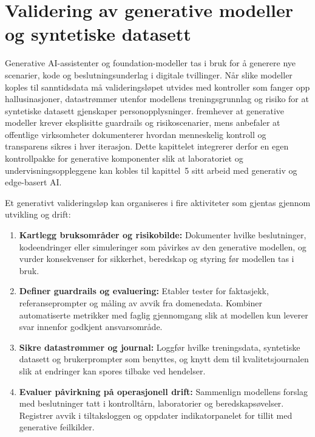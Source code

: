 \section{Validering av generative modeller og syntetiske datasett}
Generative AI-assistenter og foundation-modeller tas i bruk for å generere nye scenarier, kode og beslutningsunderlag i digitale tvillinger.\citep{siemens2023copilot,rcn2024digitalisering} Når slike modeller koples til sanntidsdata må valideringsløpet utvides med kontroller som fanger opp hallusinasjoner, datastrømmer utenfor modellens treningsgrunnlag og risiko for at syntetiske datasett gjenskaper personopplysninger. \citet{nist2023airmf} fremhever at generative modeller krever eksplisitte guardrails og risikoscenarier, mens \citet{digdir2023styringai} anbefaler at offentlige virksomheter dokumenterer hvordan menneskelig kontroll og transparens sikres i hver iterasjon. Dette kapittelet integrerer derfor en egen kontrollpakke for generative komponenter slik at laboratoriet og undervisningsoppleggene kan kobles til kapittel~5 sitt arbeid med generativ og edge-basert AI.

Et generativt valideringsløp kan organiseres i fire aktiviteter som gjentas gjennom utvikling og drift:
\begin{enumerate}
    \item \textbf{Kartlegg bruksområder og risikobilde:} Dokumenter hvilke beslutninger, kodeendringer eller simuleringer som påvirkes av den generative modellen, og vurder konsekvenser for sikkerhet, beredskap og styring før modellen tas i bruk.\citep{digdir2023styringai}
    \item \textbf{Definer guardrails og evaluering:} Etabler tester for faktasjekk, referanseprompter og måling av avvik fra domenedata. Kombiner automatiserte metrikker med faglig gjennomgang slik at modellen kun leverer svar innenfor godkjent ansvarsområde.
    \item \textbf{Sikre datastrømmer og journal:} Loggfør hvilke treningsdata, syntetiske datasett og brukerprompter som benyttes, og knytt dem til kvalitetsjournalen slik at endringer kan spores tilbake ved hendelser.\citep{digdir2024datasamarbeid}
    \item \textbf{Evaluer påvirkning på operasjonell drift:} Sammenlign modellens forslag med beslutninger tatt i kontrolltårn, laboratorier og beredskapsøvelser. Registrer avvik i tiltaksloggen og oppdater indikatorpanelet for tillit med generative feilkilder.
\end{enumerate}

